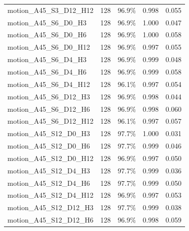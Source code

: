 \documentclass[11pt]{article}
\begin{document}
\begin{longtable}{p{}rrrr}
motion\_\allowbreak{}A45\_\allowbreak{}S3\_\allowbreak{}D12\_\allowbreak{}H12 & 128 & 96.9\% & 0.998 & 0.055\\
motion\_\allowbreak{}A45\_\allowbreak{}S6\_\allowbreak{}D0\_\allowbreak{}H3 & 128 & 96.9\% & 1.000 & 0.047\\
motion\_\allowbreak{}A45\_\allowbreak{}S6\_\allowbreak{}D0\_\allowbreak{}H6 & 128 & 96.9\% & 1.000 & 0.058\\
motion\_\allowbreak{}A45\_\allowbreak{}S6\_\allowbreak{}D0\_\allowbreak{}H12 & 128 & 96.9\% & 0.997 & 0.055\\
motion\_\allowbreak{}A45\_\allowbreak{}S6\_\allowbreak{}D4\_\allowbreak{}H3 & 128 & 96.9\% & 0.999 & 0.048\\
motion\_\allowbreak{}A45\_\allowbreak{}S6\_\allowbreak{}D4\_\allowbreak{}H6 & 128 & 96.9\% & 0.999 & 0.058\\
motion\_\allowbreak{}A45\_\allowbreak{}S6\_\allowbreak{}D4\_\allowbreak{}H12 & 128 & 96.1\% & 0.997 & 0.054\\
motion\_\allowbreak{}A45\_\allowbreak{}S6\_\allowbreak{}D12\_\allowbreak{}H3 & 128 & 96.9\% & 0.998 & 0.044\\
motion\_\allowbreak{}A45\_\allowbreak{}S6\_\allowbreak{}D12\_\allowbreak{}H6 & 128 & 96.9\% & 0.998 & 0.060\\
motion\_\allowbreak{}A45\_\allowbreak{}S6\_\allowbreak{}D12\_\allowbreak{}H12 & 128 & 96.1\% & 0.997 & 0.057\\
motion\_\allowbreak{}A45\_\allowbreak{}S12\_\allowbreak{}D0\_\allowbreak{}H3 & 128 & 97.7\% & 1.000 & 0.031\\
motion\_\allowbreak{}A45\_\allowbreak{}S12\_\allowbreak{}D0\_\allowbreak{}H6 & 128 & 97.7\% & 0.999 & 0.046\\
motion\_\allowbreak{}A45\_\allowbreak{}S12\_\allowbreak{}D0\_\allowbreak{}H12 & 128 & 96.9\% & 0.997 & 0.050\\
motion\_\allowbreak{}A45\_\allowbreak{}S12\_\allowbreak{}D4\_\allowbreak{}H3 & 128 & 97.7\% & 0.999 & 0.036\\
motion\_\allowbreak{}A45\_\allowbreak{}S12\_\allowbreak{}D4\_\allowbreak{}H6 & 128 & 97.7\% & 0.999 & 0.050\\
motion\_\allowbreak{}A45\_\allowbreak{}S12\_\allowbreak{}D4\_\allowbreak{}H12 & 128 & 96.9\% & 0.997 & 0.053\\
motion\_\allowbreak{}A45\_\allowbreak{}S12\_\allowbreak{}D12\_\allowbreak{}H3 & 128 & 97.7\% & 0.999 & 0.038\\
motion\_\allowbreak{}A45\_\allowbreak{}S12\_\allowbreak{}D12\_\allowbreak{}H6 & 128 & 96.9\% & 0.998 & 0.059\\

\end{longtable}
\end{document}
